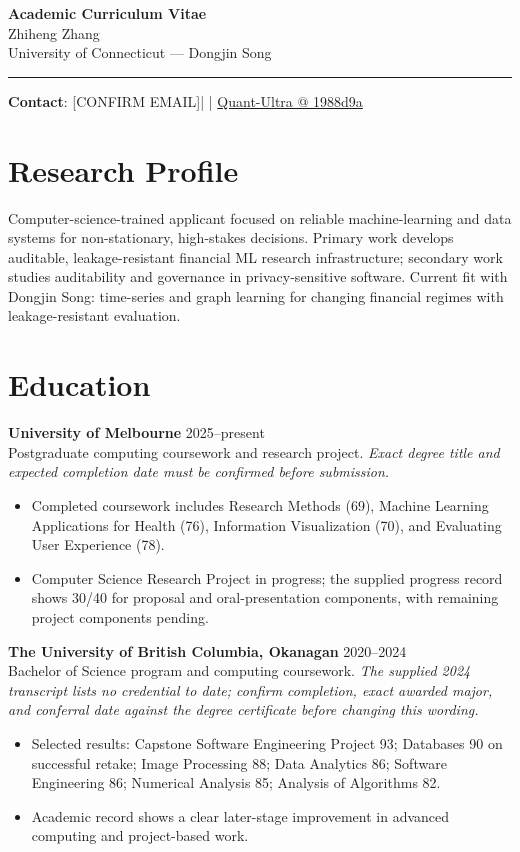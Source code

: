 \documentclass[11pt]{article}
\makeatletter
\newcommand{\ApplicantName}{Zhiheng Zhang}
\newcommand{\ApplicantEmail}{[CONFIRM EMAIL]}
\newcommand{\ApplicantPhone}{[CONFIRM PHONE]}
\newcommand{\ApplicantGitHub}{\href{https://github.com/zhiheng-zhang-Mera/Quant-Ultra/tree/1988d9a8530da91a8158de864d098ea869098923}{Quant-Ultra @ 1988d9a}}
\makeatother
\begin{document}
\begin{center}
{\LARGE\bfseries Academic Curriculum Vitae}\\[0.25em]
{\large \ApplicantName}\\
University of Connecticut --- Dongjin Song
\end{center}
\vspace{0.35em}\hrule\vspace{0.65em}

\textbf{Contact}: \ApplicantEmail\quad | \quad \ApplicantPhone\quad | \quad \ApplicantGitHub

\section*{Research Profile}
Computer-science-trained applicant focused on reliable machine-learning and data systems for non-stationary, high-stakes decisions. Primary work develops auditable, leakage-resistant financial ML research infrastructure; secondary work studies auditability and governance in privacy-sensitive software. Current fit with Dongjin Song: time-series and graph learning for changing financial regimes with leakage-resistant evaluation.

\section*{Education}
\textbf{University of Melbourne} \hfill 2025--present\\
Postgraduate computing coursework and research project. \textit{Exact degree title and expected completion date must be confirmed before submission.}
\begin{itemize}
\item Completed coursework includes Research Methods (69), Machine Learning Applications for Health (76), Information Visualization (70), and Evaluating User Experience (78).
\item Computer Science Research Project in progress; the supplied progress record shows 30/40 for proposal and oral-presentation components, with remaining project components pending.
\end{itemize}

\textbf{The University of British Columbia, Okanagan} \hfill 2020--2024\\
Bachelor of Science program and computing coursework. \textit{The supplied 2024 transcript lists no credential to date; confirm completion, exact awarded major, and conferral date against the degree certificate before changing this wording.}
\begin{itemize}
\item Selected results: Capstone Software Engineering Project 93; Databases 90 on successful retake; Image Processing 88; Data Analytics 86; Software Engineering 86; Numerical Analysis 85; Analysis of Algorithms 82.
\item Academic record shows a clear later-stage improvement in advanced computing and project-based work.
\end{itemize}
\end{document}
